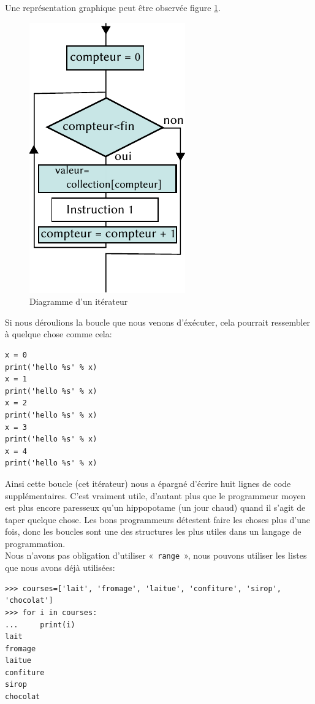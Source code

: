 Une représentation graphique peut être observée figure \ref{fig:for}.
\begin{figure}[ht]
\centering
\includegraphics[scale=1.5]{images/for.pdf}
\caption{Diagramme d'un itérateur}
\label{fig:for}
\end{figure}

Si nous déroulions la boucle que nous venons d'éxécuter, cela pourrait ressembler à quelque chose comme cela:

\begin{Verbatim}[frame=single,rulecolor=\color{gray}, label=ne pas saisir]
x = 0
print('hello %s' % x)
x = 1
print('hello %s' % x)
x = 2
print('hello %s' % x)
x = 3
print('hello %s' % x)
x = 4
print('hello %s' % x)
\end{Verbatim}

Ainsi cette boucle (cet itérateur) nous a épargné d'écrire huit lignes de code supplémentaires. C'est vraiment utile, d'autant plus que le programmeur moyen est plus encore paresseux qu'un hippopotame (un jour chaud) quand il s'agit de taper quelque chose. Les bons programmeurs détestent faire les choses plus d'une fois, donc les boucles sont une des structures les plus utiles dans un langage de programmation.\\

Nous n'avons pas obligation d'utiliser «~\texttt{range}~», nous pouvons utiliser les listes que nous avons déjà utilisées:

\begin{small}
\begin{Verbatim}[frame=single,rulecolor=\color{green}, label=à taper avec attention]
>>> courses=['lait', 'fromage', 'laitue', 'confiture', 'sirop', 'chocolat']
>>> for i in courses:
...     print(i)
lait
fromage
laitue
confiture
sirop
chocolat
\end{Verbatim}
\end{small}

